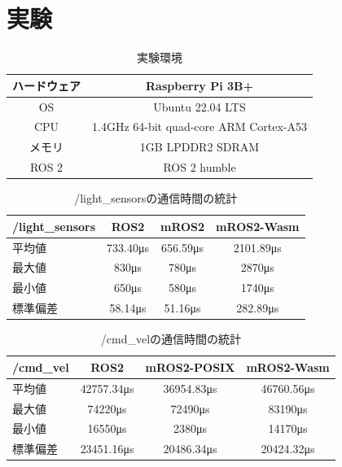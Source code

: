 \chapter{実験}
\label{chap:evaluation}
\begin{table}[ht]
  \caption{実験環境}
  \label{tab:experiment}
  \centering
  \begin{tabular}{|c|c|} \hline
    ハードウェア & Raspberry Pi 3B+ \\ \hline
    OS & Ubuntu 22.04 LTS \\ \hline
    CPU & 1.4GHz 64-bit quad-core ARM Cortex-A53 \\ \hline
    メモリ & 1GB LPDDR2 SDRAM \\ \hline
    ROS 2 & ROS 2 humble \\ \hline
  \end{tabular}
\end{table}

\begin{table}[ht]
  \centering
  \begin{tabular}{|l|c|c|c|}
  \hline
  /light\_sensors & ROS2 & mROS2 & mROS2-Wasm \\ \hline
  平均値 & 733.40μs & 656.59μs & 2101.89μs \\ \hline
  最大値 & 830μs & 780μs & 2870μs \\ \hline
  最小値 & 650μs & 580μs & 1740μs \\ \hline
  標準偏差 & 58.14μs & 51.16μs & 282.89μs \\ \hline
  \end{tabular}
  \caption{/light\_sensorsの通信時間の統計}
  \label{tab:light_sensors_stats}
\end{table}

\begin{table}[ht]
  \centering
  \begin{tabular}{|l|c|c|c|}
  \hline
  /cmd\_vel & ROS2 & mROS2-POSIX & mROS2-Wasm \\ \hline
  平均値 & 42757.34μs & 36954.83μs & 46760.56μs \\ \hline
  最大値 & 74220μs & 72490μs & 83190μs \\ \hline
  最小値 & 16550μs & 2380μs & 14170μs \\ \hline
  標準偏差 & 23451.16μs & 20486.34μs & 20424.32μs \\ \hline
  \end{tabular}
  \caption{/cmd\_velの通信時間の統計}
  \label{tab:cmd_vel_stats}
\end{table}

